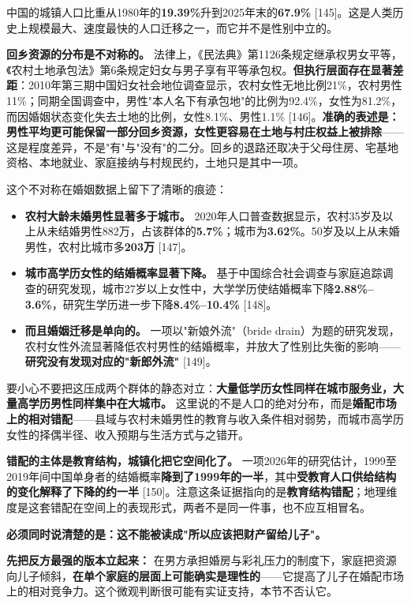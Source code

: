 \documentclass[11pt,a4paper]{ctexart}
\begin{document}
中国的城镇人口比重从1980年的\textbf{19.39\%}升到2025年末的\textbf{67.9\%}{} [145]。这是人类历史上规模最大、速度最快的人口迁移之一，而它并不是性别中立的。

\textbf{回乡资源的分布是不对称的。} 法律上，《民法典》第1126条规定继承权男女平等，《农村土地承包法》第6条规定妇女与男子享有平等承包权。\textbf{但执行层面存在显著差距}：2010年第三期中国妇女社会地位调查显示，农村女性无地比例21\%，农村男性11\%；同期全国调查中，男性"本人名下有承包地"的比例为92.4\%，女性为81.2\%，而因婚姻状态变化失去土地的比例，女性8.1\%、男性1.1\% [146]。\textbf{准确的表述是：男性平均更可能保留一部分回乡资源，女性更容易在土地与村庄权益上被排除}——这是程度差异，不是"有"与"没有"的二分。回乡的退路还取决于父母住房、宅基地资格、本地就业、家庭接纳与村规民约，土地只是其中一项。

这个不对称在婚姻数据上留下了清晰的痕迹：

\begin{itemize}
  \item \textbf{农村大龄未婚男性显著多于城市。} 2020年人口普查数据显示，农村35岁及以上从未结婚男性882万，占该群体的\textbf{5.7\%}；城市为\textbf{3.62\%}。50岁及以上从未婚男性，农村比城市多\textbf{203万}{} [147]。
  \item \textbf{城市高学历女性的结婚概率显著下降。} 基于中国综合社会调查与家庭追踪调查的研究发现，城市27岁以上女性中，大学学历使结婚概率下降\textbf{2.88\%–3.6\%}，研究生学历进一步下降\textbf{8.4\%–10.4\%}{} [148]。
  \item \textbf{而且婚姻迁移是单向的。} 一项以"新娘外流"（bride drain）为题的研究发现，农村女性外流显著降低农村男性的结婚概率，并放大了性别比失衡的影响——\textbf{研究没有发现对应的"新郎外流"}{} [149]。
\end{itemize}

要小心不要把这压成两个群体的静态对立：\textbf{大量低学历女性同样在城市服务业，大量高学历男性同样集中在大城市。} 这里说的不是人口的绝对分布，而是\textbf{婚配市场上的相对错配}——县域与农村未婚男性的教育与收入条件相对弱势，而城市高学历女性的择偶半径、收入预期与生活方式与之错开。

\textbf{错配的主体是教育结构，城镇化把它空间化了。} 一项2026年的研究估计，1999至2019年间中国单身者的结婚概率\textbf{降到了1999年的一半}，其中\textbf{受教育人口供给结构的变化解释了下降的约一半}{} [150]。注意这条证据指向的是\textbf{教育结构错配}；地理维度是这套错配在空间上的表现形式，两者不是同一件事，也不应互相冒名。

\textbf{必须同时说清楚的是：这不能被读成"所以应该把财产留给儿子"。}

\textbf{先把反方最强的版本立起来：} 在男方承担婚房与彩礼压力的制度下，家庭把资源向儿子倾斜，\textbf{在单个家庭的层面上可能确实是理性的}——它提高了儿子在婚配市场上的相对竞争力。这个微观判断很可能有实证支持，本节不否认它。
\end{document}
